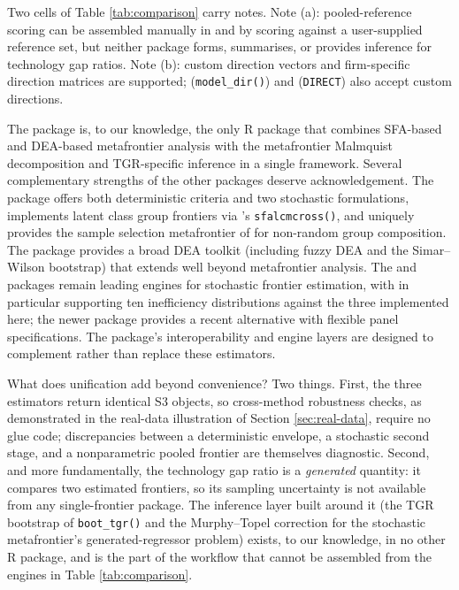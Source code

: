 Two cells of Table \ref{tab:comparison} carry notes. Note (a): pooled-reference
scoring can be assembled manually in  and 
by scoring against a user-supplied reference set, but neither package forms,
summarises, or provides inference for technology gap ratios. Note (b): custom
direction vectors and firm-specific direction matrices are supported;
 (\texttt{model\_dir()}) and  (\texttt{DIRECT}) also
accept custom directions.

The  package is, to our knowledge, the only \textsf{R}
package that combines SFA-based and DEA-based metafrontier analysis with
the metafrontier Malmquist decomposition and TGR-specific inference in a
single framework. Several complementary strengths of the other packages
deserve acknowledgement. The  package \citep{smfa} offers both
deterministic criteria and two stochastic formulations, implements latent
class group frontiers via 's \texttt{sfalcmcross()}, and uniquely
provides the sample selection metafrontier of \citet{greene2010} for non-random
group composition. The  package \citep{deaR} provides a broad DEA
toolkit (including fuzzy DEA and the Simar--Wilson bootstrap) that extends
well beyond metafrontier analysis. The  \citep{sfaR} and
 \citep{frontier} packages remain leading engines for
stochastic frontier estimation, with  in particular
supporting ten inefficiency distributions against the three implemented
here; the newer  package \citep{sfa} provides a recent alternative
with flexible panel specifications. The  package's
interoperability and engine layers are designed to complement rather than
replace these estimators.

What does unification add beyond convenience? Two things. First, the three
estimators return identical S3 objects, so cross-method robustness checks,
as demonstrated in the real-data illustration of Section \ref{sec:real-data}, require no
glue code; discrepancies between a deterministic envelope, a stochastic
second stage, and a nonparametric pooled frontier are themselves
diagnostic. Second, and more fundamentally, the technology gap ratio is a
\emph{generated} quantity: it compares two estimated frontiers, so its sampling
uncertainty is not available from any single-frontier package. The
inference layer built around it (the TGR bootstrap of \texttt{boot\_tgr()} and the
Murphy--Topel correction for the stochastic metafrontier's
generated-regressor problem) exists, to our knowledge, in no other
\textsf{R} package, and is the part of the workflow that cannot be
assembled from the engines in Table \ref{tab:comparison}.

